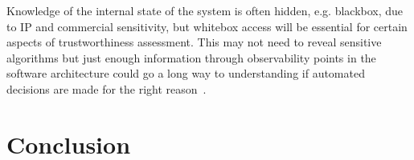 Knowledge of the internal state of the system is often hidden, e.g. blackbox, due to IP and commercial sensitivity, but whitebox access will be essential for certain aspects of trustworthiness assessment. This may not need to reveal sensitive algorithms but just enough information through observability points in the software architecture could go a long way to understanding if automated decisions are made for the right reason~\cite{koopman2018toward}. 




\section{Conclusion}\label{conclusion}










